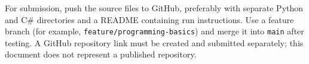 \documentclass[11pt,a4paper]{article}
\begin{document}
For submission, push the source files to GitHub, preferably with separate Python and C\# directories and a README containing run instructions. Use a feature branch (for example, \texttt{feature/programming-basics}) and merge it into \texttt{main} after testing. A GitHub repository link must be created and submitted separately; this document does not represent a published repository.
\end{document}
